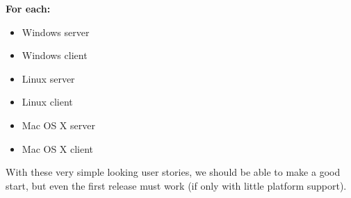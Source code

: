 \textbf{For each:}

\begin{itemize}
  \item Windows server
  \item Windows client
  \item Linux server
  \item Linux client
  \item Mac OS X server
  \item Mac OS X client
\end{itemize}

With these very simple looking user stories, we should be able to make a good 
start, but even the first release must work (if only with little platform
support).
